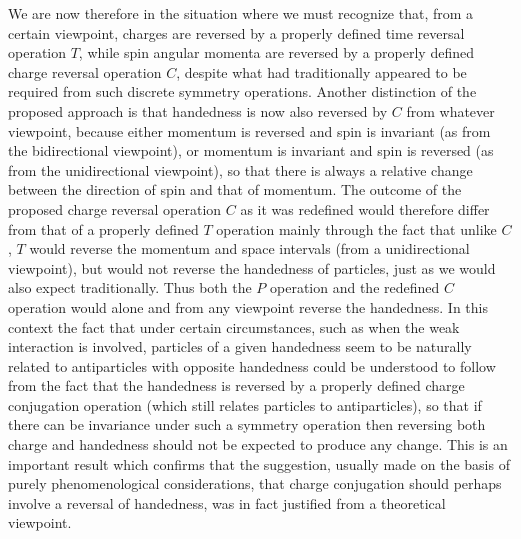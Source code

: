 \documentclass[notitlepage,12pt]{report}
\begin{document}
We are now therefore in the situation where we must recognize that, from a certain viewpoint, charges are reversed by a properly defined time reversal operation $T$, while spin angular momenta are reversed by a properly defined charge reversal operation $C$, despite what had traditionally appeared to be required from such discrete symmetry operations. Another distinction of the proposed approach is that handedness is now also reversed by $C$ from whatever viewpoint, because either momentum is reversed and spin is invariant (as from the bidirectional viewpoint), or momentum is invariant and spin is reversed (as from the unidirectional viewpoint), so that there is always a relative change between the direction of spin and that of momentum. The outcome of the proposed charge reversal operation $C$ as it was redefined would therefore differ from that of a properly defined $T$ operation mainly through the fact that unlike $C$, $T$ would reverse the momentum and space intervals (from a unidirectional viewpoint), but would not reverse the handedness of particles, just as we would also expect traditionally. Thus both the $P$ operation and the redefined $C$ operation would alone and from any viewpoint reverse the handedness. In this context the fact that under certain circumstances, such as when the weak interaction is involved, particles of a given handedness seem to be naturally related to antiparticles with opposite handedness could be understood to follow from the fact that the handedness is reversed by a properly defined charge conjugation operation (which still relates particles to antiparticles), so that if there can be invariance under such a symmetry operation then reversing both charge and handedness should not be expected to produce any change. This is an important result which confirms that the suggestion, usually made on the basis of purely phenomenological considerations, that charge conjugation should perhaps involve a reversal of handedness, was in fact justified from a theoretical viewpoint.
\end{document}
